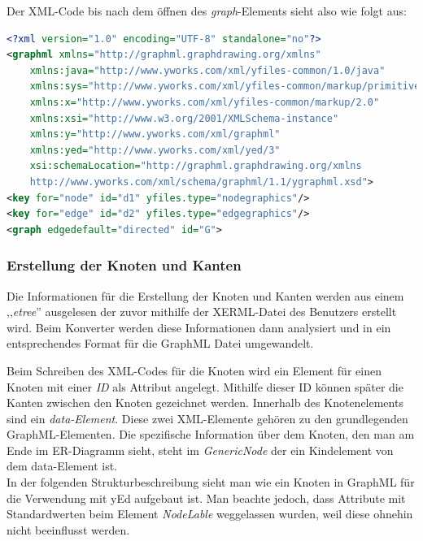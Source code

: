 \noindent
Der XML-Code bis nach dem öffnen des \textit{graph}-Elements sieht also wie folgt aus:

\begin{lstlisting}[language=XML, label={xmlHeader}, caption={Header der GraphML-Datei mit nötigen Namensräumen}]
<?xml version="1.0" encoding="UTF-8" standalone="no"?>
<graphml xmlns="http://graphml.graphdrawing.org/xmlns"
	xmlns:java="http://www.yworks.com/xml/yfiles-common/1.0/java"
	xmlns:sys="http://www.yworks.com/xml/yfiles-common/markup/primitives/2.0" 
	xmlns:x="http://www.yworks.com/xml/yfiles-common/markup/2.0"
	xmlns:xsi="http://www.w3.org/2001/XMLSchema-instance"
	xmlns:y="http://www.yworks.com/xml/graphml"
	xmlns:yed="http://www.yworks.com/xml/yed/3"
	xsi:schemaLocation="http://graphml.graphdrawing.org/xmlns
	http://www.yworks.com/xml/schema/graphml/1.1/ygraphml.xsd">
<key for="node" id="d1" yfiles.type="nodegraphics"/>
<key for="edge" id="d2" yfiles.type="edgegraphics"/>
<graph edgedefault="directed" id="G">
\end{lstlisting}

\subsubsection{Erstellung der Knoten und Kanten}
\prc

Die Informationen für die Erstellung der Knoten und Kanten werden aus einem ,,\textit{etree}'' ausgelesen der zuvor mithilfe der XERML-Datei des Benutzers erstellt wird. Beim Konverter werden diese Informationen dann analysiert und in ein entsprechendes Format für die GraphML Datei umgewandelt.


\noindent
Beim Schreiben des XML-Codes für die Knoten wird ein Element für einen Knoten mit einer \textit{ID} als Attribut angelegt. Mithilfe dieser ID können später die Kanten zwischen den Knoten gezeichnet werden. Innerhalb des Knotenelements sind ein \textit{data-Element}. Diese zwei XML-Elemente gehören zu den grundlegenden GraphML-Elementen. Die spezifische Information über dem Knoten, den man am Ende im ER-Diagramm sieht, steht im \textit{GenericNode} der ein Kindelement von dem data-Element ist. 
\\

\noindent
In der folgenden Strukturbeschreibung sieht man wie ein Knoten in GraphML für die Verwendung mit yEd aufgebaut ist. Man beachte jedoch, dass Attribute mit Standardwerten beim Element \textit{NodeLable} weggelassen wurden, weil diese ohnehin nicht  beeinflusst werden.

